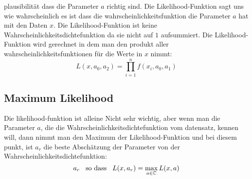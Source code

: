 \documentclass{article}
\newcommand{\smspc}{\hspace{0.3cm}}
\begin{document}
plausibilität dass die Parameter $a$ richtig sind. Die Likelihood-Funktion sagt uns wie wahrscheinlich es ist dass die wahrscheinlichkeitsfunktion die Parameter $a$ hat mit den Daten $x$. Die Likelihood-Funktion ist keine Wahrscheinlichkeitsdichtefunktion da sie nicht auf $1$ aufsummiert.
\newline Die Likelihood-Funktion wird gerechnet in dem man den produkt aller wahrscheinlichkeitsfunktionen für die Werte in $x$ nimmt:
\[L(x,a_0,a_2)=\prod_{i=1}^nf(x_i, a_0, a_1)\]
\hypertarget{maxlikelihood}{\subsection*{Maximum Likelihood}}Die likelihood-funktion ist alleine Nicht sehr wichtig, aber wenn man die Parameter $a$, die die Wahrscheinlichkeitsdichtefunktion vom datensatz, kennen will, dann nimmt man den Maximum der Likelihood-Funktion und bei diesem punkt, ist $a_r$ die beste Abschätzung der Parameter von der Wahrscheinlichkeitsdichtefunktion: \[a_r \smspc \text{so dass} \smspc L(x,a_r)=\max_{a\in \mathbb{C}}L(x,a)\]
\hyper
\end{document}
